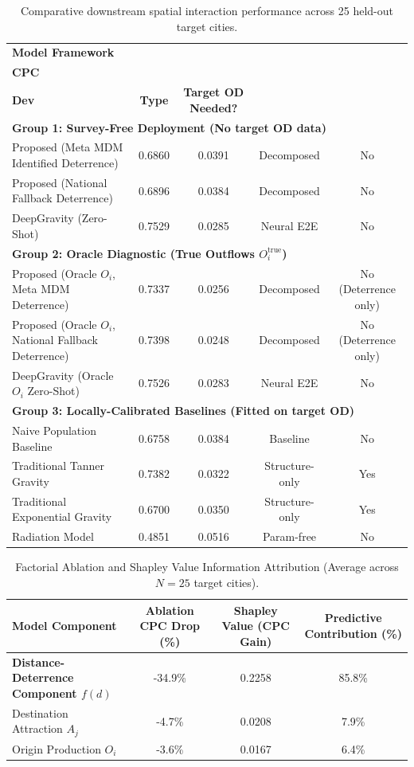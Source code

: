 \documentclass[pdflatex,sn-basic,iicol]{sn-jnl}
\begin{document}
\begin{table}[t]
\centering
\tablebodyfont\small
\caption{Comparative downstream spatial interaction performance across 25 held-out target cities.}
\label{tab:multibaseline_comparison}
\begin{tabular*}{\textwidth}{@{\extracolsep{\fill}}p{5.5cm}cccc}
\toprule
\textbf{Model Framework} & \shortstack[c]{\textbf{Mean} \\ \textbf{CPC}} & \shortstack[c]{\textbf{Std} \\ \textbf{Dev}} & \textbf{Type} & \textbf{Target OD Needed?} \\
\midrule
\multicolumn{5}{l}{\textbf{Group 1: Survey-Free Deployment (No target OD data)}} \\
Proposed (Meta MDM Identified Deterrence) & 0.6860 & 0.0391 & Decomposed & No \\
Proposed (National Fallback Deterrence) & 0.6896 & 0.0384 & Decomposed & No \\
DeepGravity (Zero-Shot) & 0.7529 & 0.0285 & Neural E2E & No \\
\midrule
\multicolumn{5}{l}{\textbf{Group 2: Oracle Diagnostic (True Outflows $O_i^{\text{true}}$)}} \\
Proposed (Oracle $O_i$, Meta MDM Deterrence) & 0.7337 & 0.0256 & Decomposed & No (Deterrence only) \\
Proposed (Oracle $O_i$, National Fallback Deterrence) & 0.7398 & 0.0248 & Decomposed & No (Deterrence only) \\
DeepGravity (Oracle $O_i$ Zero-Shot) & 0.7526 & 0.0283 & Neural E2E & No \\
\midrule
\multicolumn{5}{l}{\textbf{Group 3: Locally-Calibrated Baselines (Fitted on target OD)}} \\
Naive Population Baseline & 0.6758 & 0.0384 & Baseline & No \\
Traditional Tanner Gravity & 0.7382 & 0.0322 & Structure-only & Yes \\
Traditional Exponential Gravity & 0.6700 & 0.0350 & Structure-only & Yes \\
Radiation Model & 0.4851 & 0.0516 & Param-free & No \\
\bottomrule
\end{tabular*}
\end{table}

\begin{table}[t]
\centering
\tablebodyfont\small
\caption{Factorial Ablation and Shapley Value Information Attribution (Average across $N=25$ target cities).}
\label{tab:ablation}
\begin{tabular*}{\textwidth}{@{\extracolsep{\fill}}lccc}
\toprule
\textbf{Model Component} & \textbf{Ablation CPC Drop (\%)} & \textbf{Shapley Value (CPC Gain)} & \textbf{Predictive Contribution (\%)} \\
\midrule
\textbf{Distance-Deterrence Component $f(d)$} & -34.9\% & 0.2258 & 85.8\% \\
Destination Attraction $A_j$ & -4.7\% & 0.0208 & 7.9\% \\
Origin Production $O_i$ & -3.6\% & 0.0167 & 6.4\% \\
\bottomrule
\end{tabular*}
\end{table}
\end{document}
